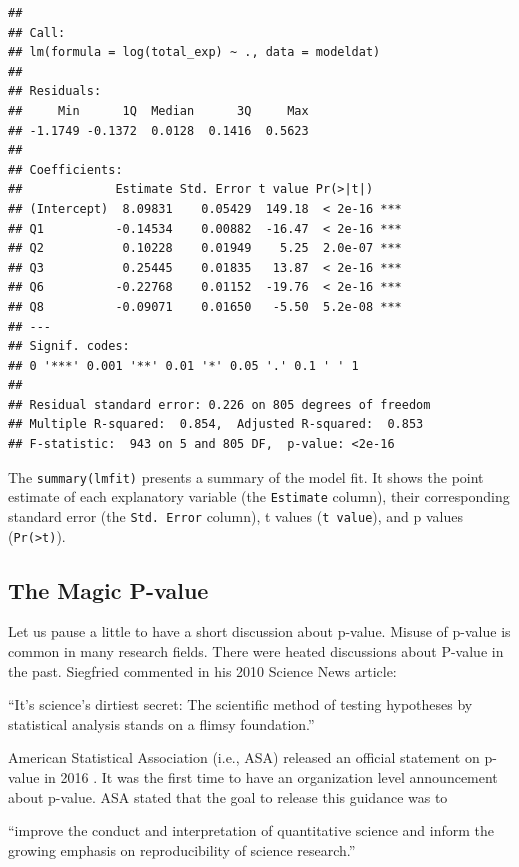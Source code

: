 \documentclass[12pt,]{krantz}
\renewenvironment{quote}{\begin{VF}}{\end{VF}}
\begin{document}
\begin{verbatim}
## 
## Call:
## lm(formula = log(total_exp) ~ ., data = modeldat)
## 
## Residuals:
##     Min      1Q  Median      3Q     Max 
## -1.1749 -0.1372  0.0128  0.1416  0.5623 
## 
## Coefficients:
##             Estimate Std. Error t value Pr(>|t|)    
## (Intercept)  8.09831    0.05429  149.18  < 2e-16 ***
## Q1          -0.14534    0.00882  -16.47  < 2e-16 ***
## Q2           0.10228    0.01949    5.25  2.0e-07 ***
## Q3           0.25445    0.01835   13.87  < 2e-16 ***
## Q6          -0.22768    0.01152  -19.76  < 2e-16 ***
## Q8          -0.09071    0.01650   -5.50  5.2e-08 ***
## ---
## Signif. codes:  
## 0 '***' 0.001 '**' 0.01 '*' 0.05 '.' 0.1 ' ' 1
## 
## Residual standard error: 0.226 on 805 degrees of freedom
## Multiple R-squared:  0.854,	Adjusted R-squared:  0.853 
## F-statistic:  943 on 5 and 805 DF,  p-value: <2e-16
\end{verbatim}

The \texttt{summary(lmfit)} presents a summary of the model fit. It shows the point estimate of each explanatory variable (the \texttt{Estimate} column), their corresponding standard error (the \texttt{Std.\ Error} column), t values (\texttt{t\ value}), and p values (\texttt{Pr(\textgreater{}\textbar{}t\textbar{})}).

\hypertarget{the-magic-p-value}{%
\subsection{The Magic P-value}\label{the-magic-p-value}}

Let us pause a little to have a short discussion about p-value. Misuse of p-value is common in many research fields. There were heated discussions about P-value in the past. Siegfried commented in his 2010 Science News article: 

\begin{quote}
``It's science's dirtiest secret: The scientific method of testing hypotheses by statistical analysis stands on a flimsy foundation.''
\end{quote}

American Statistical Association (i.e., ASA) released an official statement on p-value in 2016 \citep{ASA_P}. It was the first time to have an organization level announcement about p-value. ASA stated that the goal to release this guidance was to

\begin{quote}
``improve the conduct and interpretation of quantitative science and inform the growing emphasis on reproducibility of science research.''
\end{quote}
\end{document}
